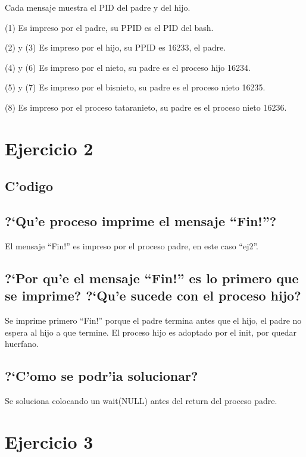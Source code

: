 \documentclass[a4paper,8pt]{article}
\newcommand{\?}{?`}
\begin{document}
Cada mensaje muestra el PID del padre y del hijo.

\begin{description}
 \item (1) Es impreso por el padre, su PPID es el PID del bash.
 \item (2) y (3) Es impreso por el hijo, su PPID es 16233, el padre.
 \item (4) y (6) Es impreso por el nieto, su padre es el proceso hijo 16234.
 \item (5) y (7) Es impreso por el bisnieto, su padre es el proceso nieto 16235.
 \item (8) Es impreso por el proceso tataranieto, su padre es el proceso nieto 16236.
\end{description}

\section{Ejercicio 2}
\subsection{C'odigo}

\subsection[Punto A]{\?Qu'e proceso imprime el mensaje ``Fin!''?}
El mensaje ``Fin!'' es impreso por el proceso padre, en este caso ``ej2''.

\subsection[Punto B]{\?Por qu'e el mensaje ``Fin!'' es lo primero que se imprime? \?Qu'e sucede con el proceso hijo?}
Se imprime primero ``Fin!'' porque el padre termina antes que el hijo, el padre no espera al hijo a que termine. El proceso hijo es adoptado por el init, por quedar huerfano.

\subsection[Punto C]{\?C'omo se podr'ia solucionar?}
Se soluciona colocando un wait(NULL) antes del return del proceso padre.

\section{Ejercicio 3}
\end{document}
